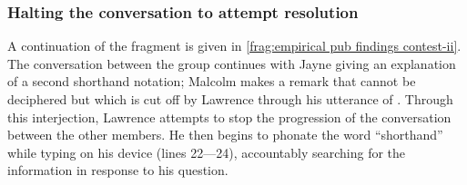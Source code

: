 \subsubsection{Halting the conversation to attempt resolution}\label{sec:empirical pub findings contest halting}
\begin{revisedsubmission}
A continuation of the fragment is given in \autoref{frag:empirical pub findings contest-ii}.
The conversation between the group continues with Jayne giving an explanation of a second shorthand notation;
Malcolm makes a remark that cannot be deciphered but which is cut off by Lawrence through his utterance of .
Through this interjection, Lawrence attempts to stop the progression of the conversation between the other members.
He then begins to phonate the word ``shorthand'' while typing on his device (lines 22---24), accountably searching for the information in response to his question.


\end{revisedsubmission}
